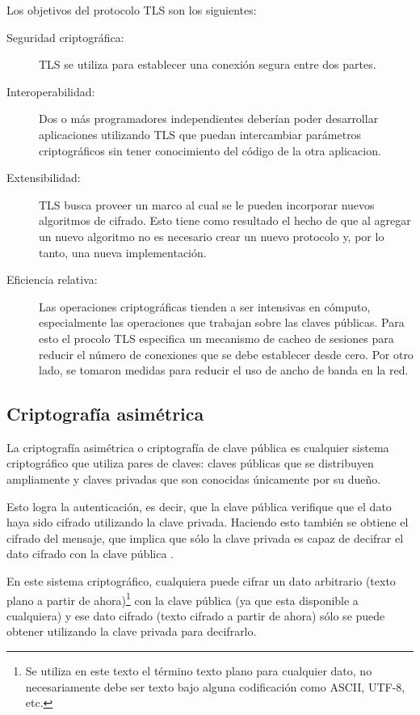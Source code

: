 Los objetivos del protocolo TLS son los siguientes:
\begin{description}
	\item [Seguridad criptográfica:] TLS se utiliza para establecer una conexión segura entre dos partes.
	\item [Interoperabilidad:] Dos o más programadores independientes deberían poder desarrollar aplicaciones utilizando TLS que puedan intercambiar parámetros criptográficos sin tener conocimiento del código de la otra aplicacion.
	\item [Extensibilidad:] TLS busca proveer un marco al cual se le pueden incorporar nuevos algoritmos de cifrado. Esto tiene como resultado el hecho de que al agregar un nuevo algoritmo no es necesario crear un nuevo protocolo y, por lo tanto, una nueva implementación.
	\item [Eficiencia relativa:] Las operaciones criptográficas tienden a ser intensivas en cómputo, especialmente las operaciones que trabajan sobre las claves públicas. Para esto el procolo TLS especifica un mecanismo de cacheo de sesiones para reducir el número de conexiones que se debe establecer desde cero. Por otro lado, se tomaron medidas para reducir el uso de ancho de banda en la red.
\end{description}

\subsection{Criptografía asimétrica}
La criptografía asimétrica o criptografía de clave pública es cualquier sistema criptográfico que utiliza pares de claves: claves públicas que se distribuyen ampliamente y claves privadas que son conocidas únicamente por su dueño. 

Esto logra la autenticación, es decir, que la clave pública verifique que el dato haya sido cifrado utilizando la clave privada. Haciendo esto también se obtiene el cifrado del mensaje, que implica que sólo la clave privada es capaz de decifrar el dato cifrado con la clave pública \cite{crypto}.

En este sistema criptográfico, cualquiera puede cifrar un dato arbitrario (texto plano a partir de ahora)\footnote{Se utiliza en este texto el término texto plano para cualquier dato, no necesariamente debe ser texto bajo alguna codificación como ASCII, UTF-8, etc.} con la clave pública (ya que esta disponible a cualquiera) y ese dato cifrado (texto cifrado a partir de ahora) sólo se puede obtener utilizando la clave privada para decifrarlo.

